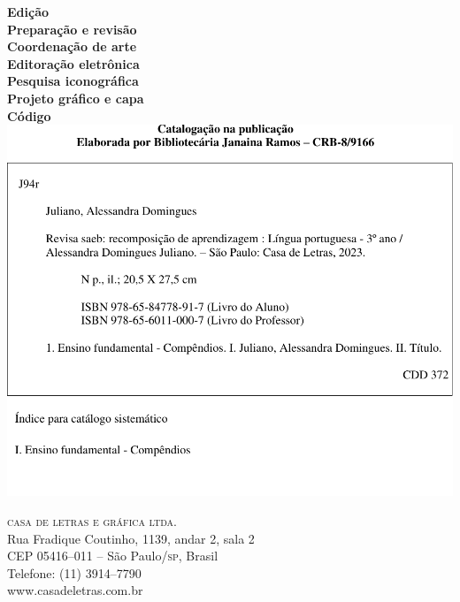 \textbf{Edição}\\
\textbf{Preparação e revisão}\\
\textbf{Coordenação de arte}\\
\textbf{Editoração eletrônica}\\
\textbf{Pesquisa iconográfica}\\
\textbf{Projeto gráfico e capa}\\
\textbf{Código}
\noindent\includegraphics{../fichas/3POR.pdf}

\vfill

\textsc{casa de letras e gráfica ltda.}\\
Rua Fradique Coutinho, 1139, andar 2, sala 2\\
CEP 05416--011 -- São Paulo/\textsc{sp}, Brasil\\
Telefone: (11) 3914--7790\\\smallskip
www.casadeletras.com.br\\

\endgroup
\pagebreak
